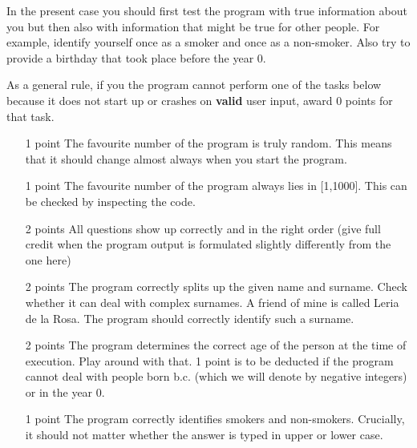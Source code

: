 \documentclass[11pt, leqno, a4paper]{article}
\begin{document}
In the present case you should first test the program with true information about you but then also with
information that might be true for other people. For example, identify yourself once as a smoker and once as a non-smoker. Also try to provide a birthday that took place before the year 0.

As a general rule, if you the program cannot perform one of the tasks below because it does not start up
or crashes on \textbf{valid} user input, award 0 points for that task.

\enlargethispage{1cm}

\begin{itemize}
\item[1 point] The favourite number of the program is truly random. This means that it should change
almost always when you start the program.
\item[1 point] The favourite number of the program always lies in [1,1000]. This can be checked by inspecting the code.
\item[2 points] All questions show up correctly and in the right order (give full credit when the program output is formulated slightly differently from the one here)
\item[2 points] The program correctly splits up the given name and surname. Check whether it can deal with complex surnames. A friend of mine is called
Leria de la Rosa. The program should correctly identify such a surname.
\item[2 points] The program determines the correct age of the person at the time of execution. Play around with that. 1 point is to be deducted if the
program cannot deal with people born b.c. (which we will denote by negative integers) or in the year 0.
\item[1 point] The program correctly identifies smokers and non-smokers. Crucially, it should not matter whether the answer is typed in upper or lower case.
\end{itemize}
\end{document}
